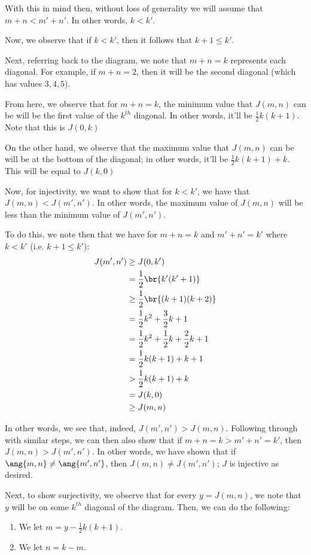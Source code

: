 \documentclass{article}
\begin{document}
\begin{solution}
	 With this in mind then, without loss of generality we will assume that $m+n < m' + n'$. In other words, $k < k'$.
	 
	 Now, we observe that if $k < k'$, then it follows that $k+1 \leq k'$.
	 
	 Next, referring back to the diagram, we note that $m+n = k$ represents each diagonal. For example, if $m+n = 2$, then it will be the second diagonal (which has values $3,4,5$).
	 
	 From here, we observe that for $m+n = k$, the minimum value that $J(m,n)$ can be will be the first value of the $k^{th}$ diagonal. In other words, it'll be $\frac{1}{2}k(k+1)$. Note that this is $J(0, k)$
	 
	 On the other hand, we observe that the maximum value that $J(m,n)$ can be will be at the bottom of the diagonal; in other words, it'll be $\frac{1}{2}k(k+1) + k$. This will be equal to $J(k, 0)$
	 
	 Now, for injectivity, we want to show that for $k < k'$, we have that $J(m,n) < J(m', n')$. In other words, the maximum value of $J(m,n)$ will be less than the minimum value of $J(m',n')$.
	 
	 To do this, we note then that we have for $m+n = k$ and $m'+n' = k'$ where $k < k'$ (i.e. $k+1 \leq k'$):
	 \begin{align*}
	 	J(m', n') &\geq J(0, k') \\
	 	&= \frac{1}{2}\br{ k'(k'+1)} \\
	 	&\geq \frac{1}{2}\br{ (k+1)(k+2)} \\
	 	&= \frac{1}{2}k^{2} + \frac{3}{2}k + 1 \\
	 	&= \frac{1}{2}k^{2} + \frac{1}{2}k + \frac{2}{2}k + 1 \\
	 	&= \frac{1}{2}k(k+1) + k + 1 \\
	 	&> \frac{1}{2}k(k+1) + k \\
	 	&= J(k, 0) \\
	 	&\geq J(m,n)
	 \end{align*}
 
 	In other words, we see that, indeed, $J(m',n') > J(m,n)$. Following through with similar steps, we can then also show that if $m+n = k > m'+n' = k'$, then $J(m,n) > J(m',n')$. In other words, we have shown that if $\ang{m,n} \neq \ang{m', n'}$, then $J(m,n) \neq J(m', n')$; $J$ is injective as desired.
 	
 	Next, to show surjectivity, we observe that for every $y = J(m,n)$, we note that $y$ will be on some $k^{th}$ diagonal of the diagram. Then, we can do the following:
 	\begin{enumerate}
 		\item We let $m = y - \frac{1}{2}k(k+1)$.
 		\item We let $n = k - m$.
 	\end{enumerate}
 

\end{solution}
\end{document}
